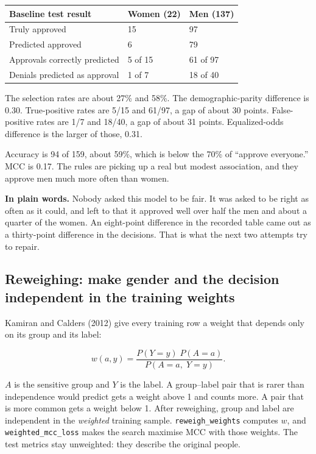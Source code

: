 \documentclass[11pt]{article}
\newcommand{\fn}[1]{\texttt{\small #1}}
\newcommand{\pct}[1]{\mbox{#1\%}}
\begin{document}
\begin{table}[H]
\centering
\small
\begin{tabularx}{\textwidth}{@{}l Y Y@{}}
\toprule
Baseline test result & Women (22) & Men (137) \\
\midrule
Truly approved & 15 & 97 \\
Predicted approved & 6 & 79 \\
Approvals correctly predicted & 5 of 15 & 61 of 97 \\
Denials predicted as approval & 1 of 7 & 18 of 40 \\
\bottomrule
\end{tabularx}
\end{table}

The selection rates are about \pct{27} and \pct{58}. The demographic-parity difference is 0.30. True-positive rates are 5/15 and 61/97, a gap of about 30 points. False-positive rates are 1/7 and 18/40, a gap of about 31 points. Equalized-odds difference is the larger of those, 0.31.

Accuracy is 94 of 159, about \pct{59}, which is below the \pct{70} of ``approve everyone.'' MCC is 0.17. The rules are picking up a real but modest association, and they approve men much more often than women.

\begin{plainwords}
\textbf{In plain words.} Nobody asked this model to be fair. It was asked to be right as often as it could, and left to that it approved well over half the men and about a quarter of the women. An eight-point difference in the recorded table came out as a thirty-point difference in the decisions. That is what the next two attempts try to repair.
\end{plainwords}

\subsection{Reweighing: make gender and the decision independent in the training weights}

Kamiran and Calders (2012) give every training row a weight that depends only on its group and its label:

\[
w(a, y)
=
\frac{P(Y = y)\; P(A = a)}{P(A = a,\; Y = y)}.
\]

\(A\) is the sensitive group and \(Y\) is the label. A group--label pair that is rarer than independence would predict gets a weight above 1 and counts more. A pair that is more common gets a weight below 1. After reweighing, group and label are independent in the \emph{weighted} training sample. \fn{reweigh\_weights} computes \(w\), and \fn{weighted\_mcc\_loss} makes the search maximise MCC with those weights. The test metrics stay unweighted: they describe the original people.
\end{document}
